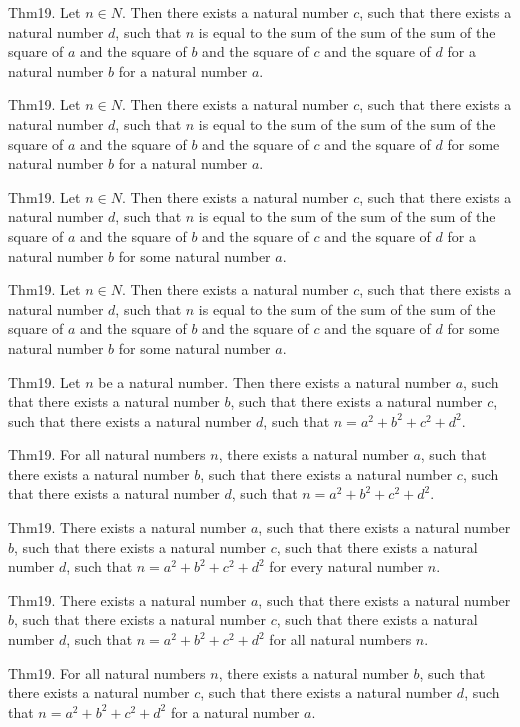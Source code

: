 \documentclass{article}
\begin{document}
Thm19. Let $n \in N$. Then there exists a natural number $c$, such that there exists a natural number $d$, such that $n$ is equal to the sum of the sum of the sum of the square of $a$ and the square of $b$ and the square of $c$ and the square of $d$ for a natural number $b$ for a natural number $a$.

Thm19. Let $n \in N$. Then there exists a natural number $c$, such that there exists a natural number $d$, such that $n$ is equal to the sum of the sum of the sum of the square of $a$ and the square of $b$ and the square of $c$ and the square of $d$ for some natural number $b$ for a natural number $a$.

Thm19. Let $n \in N$. Then there exists a natural number $c$, such that there exists a natural number $d$, such that $n$ is equal to the sum of the sum of the sum of the square of $a$ and the square of $b$ and the square of $c$ and the square of $d$ for a natural number $b$ for some natural number $a$.

Thm19. Let $n \in N$. Then there exists a natural number $c$, such that there exists a natural number $d$, such that $n$ is equal to the sum of the sum of the sum of the square of $a$ and the square of $b$ and the square of $c$ and the square of $d$ for some natural number $b$ for some natural number $a$.

Thm19. Let $n$ be a natural number. Then there exists a natural number $a$, such that there exists a natural number $b$, such that there exists a natural number $c$, such that there exists a natural number $d$, such that $n = a ^{ 2}+ b ^{ 2}+ c ^{ 2}+ d ^{ 2}$.

Thm19. For all natural numbers $n$, there exists a natural number $a$, such that there exists a natural number $b$, such that there exists a natural number $c$, such that there exists a natural number $d$, such that $n = a ^{ 2}+ b ^{ 2}+ c ^{ 2}+ d ^{ 2}$.

Thm19. There exists a natural number $a$, such that there exists a natural number $b$, such that there exists a natural number $c$, such that there exists a natural number $d$, such that $n = a ^{ 2}+ b ^{ 2}+ c ^{ 2}+ d ^{ 2}$ for every natural number $n$.

Thm19. There exists a natural number $a$, such that there exists a natural number $b$, such that there exists a natural number $c$, such that there exists a natural number $d$, such that $n = a ^{ 2}+ b ^{ 2}+ c ^{ 2}+ d ^{ 2}$ for all natural numbers $n$.

Thm19. For all natural numbers $n$, there exists a natural number $b$, such that there exists a natural number $c$, such that there exists a natural number $d$, such that $n = a ^{ 2}+ b ^{ 2}+ c ^{ 2}+ d ^{ 2}$ for a natural number $a$.
\end{document}
